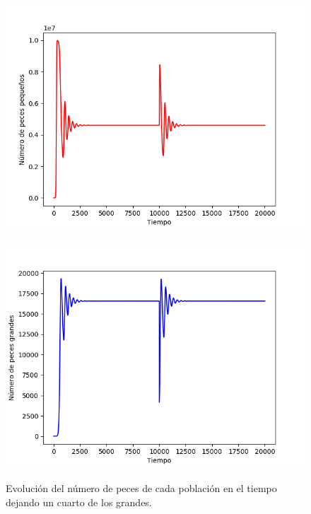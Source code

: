 \documentclass[11pt,a4paper]{report}
\begin{document}
\begin{figure}[H]
\centering
\begin{minipage}{.5\textwidth}
  \centering
  \includegraphics[scale=0.4]{img/peces-p-cuarto.png}
  \label{fig:peces-p-cuarto}
\end{minipage}%
\begin{minipage}{.5\textwidth}
  \centering
  \includegraphics[scale=0.4]{img/peces-g-cuarto.png}
  \label{fig:peces-g-cuarto}
\end{minipage}
\caption{Evolución del número de peces de cada población en el tiempo dejando un cuarto de los grandes.}
\end{figure}
\end{document}
